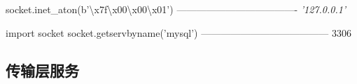 \documentclass[11pt]{article}
\newenvironment{Shaded}{}{}
\newcommand{\DecValTok}[1]{\textcolor[rgb]{0.25,0.63,0.44}{{#1}}}
\newcommand{\CharTok}[1]{\textcolor[rgb]{0.25,0.44,0.63}{{#1}}}
\newcommand{\StringTok}[1]{\textcolor[rgb]{0.25,0.44,0.63}{{#1}}}
\newcommand{\CommentTok}[1]{\textcolor[rgb]{0.38,0.63,0.69}{\textit{{#1}}}}
\newcommand{\NormalTok}[1]{{#1}}
\newcommand{\ImportTok}[1]{{#1}}
\newcommand{\OperatorTok}[1]{\textcolor[rgb]{0.40,0.40,0.40}{{#1}}}
\begin{document}
\begin{Shaded}
\begin{Highlighting}[]
\NormalTok{socket.inet_aton(b}\StringTok{'}\CharTok{\textbackslash{}x7f\textbackslash{}x00\textbackslash{}x00\textbackslash{}x01}\StringTok{'}\NormalTok{)}
\OperatorTok{-------------------------------------}
\CommentTok{'127.0.0.1'}
\end{Highlighting}
\end{Shaded}

\begin{Shaded}
\begin{Highlighting}[]
\ImportTok{import}\NormalTok{ socket}
\NormalTok{socket.getservbyname(}\StringTok{'mysql'}\NormalTok{)}
\OperatorTok{---------------------------------------}
\DecValTok{3306}
\end{Highlighting}
\end{Shaded}

\subsection{传输层服务}\label{ux4f20ux8f93ux5c42ux670dux52a1}
\end{document}
